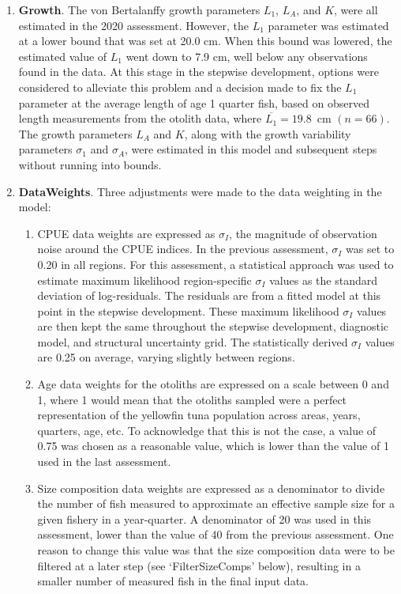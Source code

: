 \begin{enumerate}
  \item \textbf{Growth}. The von Bertalanffy growth parameters $L_1$, $L_A$, and $K$, were all estimated in the 2020 assessment. However, the $L_1$ parameter was estimated at a lower bound that was set at 20.0 cm. When this bound was lowered, the estimated value of $L_1$ went down to 7.9 cm, well below any observations found in the data. At this stage in the stepwise development, options were considered to alleviate this problem and a decision made to fix the $L_1$ parameter at the average length of age 1 quarter fish, based on observed length measurements from the otolith data, where $\overline{L_1}=19.8$~cm $(n=66)$. The growth parameters $L_A$ and $K$, along with the growth variability parameters $\sigma_1$ and $\sigma_A$, were estimated in this model and subsequent steps without running into bounds.

  \item \textbf{DataWeights}. Three adjustments were made to the data weighting in the model:
  \begin{enumerate}
    \item CPUE data weights are expressed as $\sigma_I$, the magnitude of observation noise around the CPUE indices. In the previous assessment, $\sigma_I$ was set to 0.20 in all regions. For this assessment, a statistical approach was used to estimate maximum likelihood region-specific $\sigma_I$ values as the standard deviation of log-residuals. The residuals are from a fitted model at this point in the stepwise development. These maximum likelihood $\sigma_I$ values are then kept the same throughout the stepwise development, diagnostic model, and structural uncertainty grid. The statistically derived $\sigma_I$ values are 0.25 on average, varying slightly between regions.
    \item Age data weights for the otoliths are expressed on a scale between 0 and 1, where 1 would mean that the otoliths sampled were a perfect representation of the yellowfin tuna population across areas, years, quarters, age, etc. To acknowledge that this is not the case, a value of 0.75 was chosen as a reasonable value, which is lower than the value of 1 used in the last assessment.
    \item Size composition data weights are expressed as a denominator to divide the number of fish measured to approximate an effective sample size for a given fishery in a year-quarter. A denominator of 20 was used in this assessment, lower than the value of 40 from the previous assessment. One reason to change this value was that the size composition data were to be filtered at a later step (see `FilterSizeComps' below), resulting in a smaller number of measured fish in the final input data.
  \end{enumerate}


\end{enumerate}

